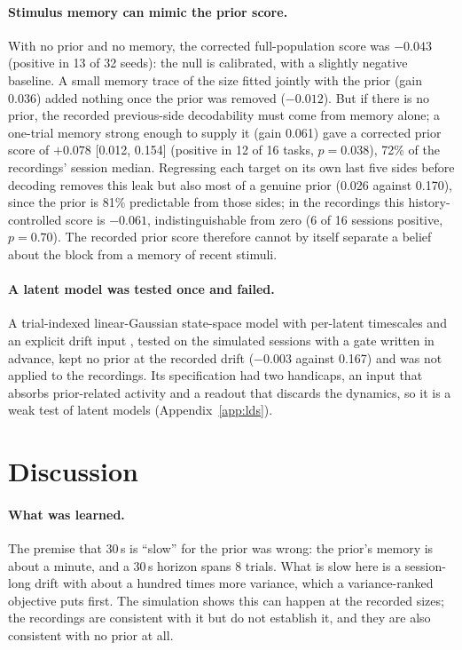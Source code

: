 \documentclass{article}
\begin{document}
\paragraph{Stimulus memory can mimic the prior score.} With no prior and no memory, the corrected full-population score
was $-0.043$ (positive in 13 of 32 seeds): the null is calibrated, with a slightly negative baseline. A small memory
trace of the size fitted jointly with the prior (gain 0.036) added nothing once the prior was removed ($-0.012$). But
if there is no prior, the recorded previous-side decodability must come from memory alone; a one-trial memory strong
enough to supply it (gain 0.061) gave a corrected prior score of $+0.078$ [0.012, 0.154] (positive in 12 of 16 tasks,
$p = 0.038$), 72\% of the recordings' session median. Regressing each target on its own last five sides before decoding removes this leak but also most of a genuine
prior (0.026 against 0.170), since the prior is 81\% predictable from those sides; in the recordings this
history-controlled score is $-0.061$, indistinguishable from zero (6 of 16 sessions positive, $p = 0.70$). The recorded prior score therefore
cannot by itself separate a belief about the block from a memory of recent stimuli.

\paragraph{A latent model was tested once and failed.} A trial-indexed linear-Gaussian state-space model with
per-latent timescales and an explicit drift input \citep{yu2009,macke2011}, tested on the simulated sessions with a
gate written in advance, kept no prior at the recorded drift ($-0.003$ against 0.167) and was not applied to the
recordings. Its specification had two handicaps, an input that absorbs prior-related activity and a readout that
discards the dynamics, so it is a weak test of latent models (Appendix~\ref{app:lds}).

\section{Discussion}
\label{sec:discussion}

\paragraph{What was learned.} The premise that 30\,s is ``slow'' for the prior was wrong: the prior's memory is
about a minute, and a 30\,s horizon spans 8 trials. What is slow here is a session-long drift with about a hundred times more variance,
which a variance-ranked objective puts first. The simulation shows this can happen at the recorded sizes; the
recordings are consistent with it but do not establish it, and they are also consistent with no prior at all.
\end{document}
